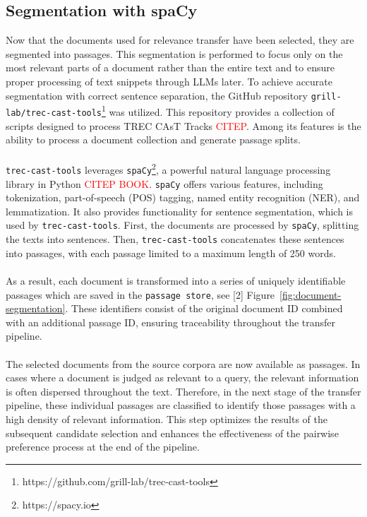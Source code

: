 \subsection{Segmentation with spaCy}\label{segmentation-with-spacy}

Now that the documents used for relevance transfer have been selected, they are segmented into passages. This segmentation is performed to focus only on the most relevant parts of a document rather than the entire text and to ensure proper processing of text snippets through LLMs later. To achieve accurate segmentation with correct sentence separation, the GitHub repository \texttt{grill-lab/trec-cast-tools}\footnote{https://github.com/grill-lab/trec-cast-tools} was utilized. This repository provides a collection of scripts designed to process TREC CAsT Tracks \textcolor{red}{CITEP}. Among its features is the ability to process a document collection and generate passage splits.
\\\\
\texttt{trec-cast-tools} leverages \texttt{spaCy}\footnote{https://spacy.io}, a powerful natural language processing library in Python \textcolor{red}{CITEP BOOK}. \texttt{spaCy} offers various features, including tokenization, part-of-speech (POS) tagging, named entity recognition (NER), and lemmatization. It also provides functionality for sentence segmentation, which is used by \texttt{trec-cast-tools}. First, the documents are processed by \texttt{spaCy}, splitting the texts into sentences. Then, \texttt{trec-cast-tools} concatenates these sentences into passages, with each passage limited to a maximum length of 250 words.
\\\\
As a result, each document is transformed into a series of uniquely identifiable passages which are saved in the \texttt{passage store}, see [2] Figure~\ref{fig:document-segmentation}. These identifiers consist of the original document ID combined with an additional passage ID, ensuring traceability throughout the transfer pipeline.
\\\\
The selected documents from the source corpora are now available as passages. In cases where a document is judged as relevant to a query, the relevant information is often dispersed throughout the text. Therefore, in the next stage of the transfer pipeline, these individual passages are classified to identify those passages with a high density of relevant information. This step optimizes the results of the subsequent candidate selection and enhances the effectiveness of the pairwise preference process at the end of the pipeline.


